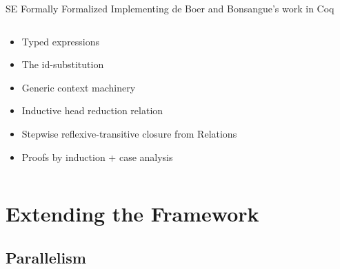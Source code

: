\documentclass{beamer}
\newcommand{\faded}[2][35]{\textcolor{fg!#1}{#2}}
\DeclareMathOperator{\skips}{\mathtt{skip}}
\begin{document}
\begin{frame}{SE Formally Formalized}
  Implementing de Boer and Bonsangue's work in Coq
  \begin{columns}
    \begin{column}{.5\textwidth}
      \begin{itemize}[<+->]
        \item Typed expressions
        \item The id-substitution
        \item Generic context machinery
        \item Inductive head reduction relation
        \item Stepwise reflexive-transitive closure from Relations
        \item Proofs by induction + case analysis
      \end{itemize}
    \end{column}
    \begin{column}{.5\textwidth}
      \uncover<3->{
        \begin{align*}
          C ::&= \square \mid C~;~s\\
          s ::&= \faded{\ldots}\\
              &\mid \skips\\
        \end{align*}}
    \end{column}
  \end{columns}
  \vfill{}
\end{frame}

\section{Extending the Framework}
\subsection{Parallelism}
\end{document}
